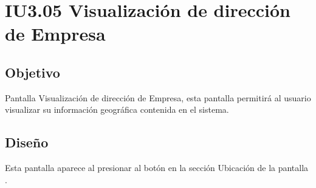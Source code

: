 \newpage
\section{IU3.05 Visualización de dirección de Empresa}

\subsection{Objetivo}
	Pantalla Visualización de dirección de Empresa, esta pantalla permitirá al usuario visualizar su información geográfica contenida en el sistema.
	


\subsection{Diseño}
	Esta pantalla aparece al presionar al botón  en la sección Ubicación de la pantalla .

	

